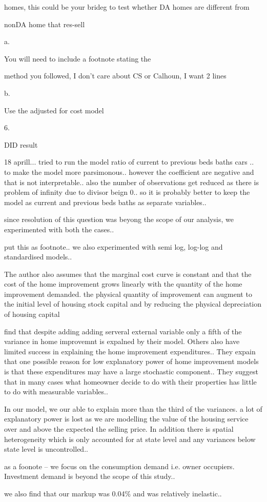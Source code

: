 homes, this could be your brideg to test whether DA homes are different from

nonDA home that res-sell





a.     

You will need to include a footnote stating the

method you followed, I don’t care about CS or Calhoun, I want 2 lines





b.     

Use the adjusted for cost model





6.     

DID result




18 aprill...
tried to run the model ratio of current to previous beds baths cars .. to make the model more parsimonous.. however the coefficient are negative and that is not interpretable..
also the number of observations get reduced as there is problem of infinity due to divisor beign 0.. so it is probably better to keep the model as current and previous beds baths as separate variables..

since resolution of this question was beyong the scope of our analysis, we experimented with both the cases..


put this as footnote.. we also experimented with semi log, log-log and standardised models..



\cite{boehm1986improvement}  The author also assumes that the marginal cost curve is constant and that the cost of the home improvement grows linearly with the quantity of the home improvement demanded.
the physical quantity of improvement can augment to the initial level of housing stock capital and by reducing the physical depreciation of housing capital

\cite{boehm1986improvement} find that despite adding adding serveral external variable only a fifth of the variance in home improvemnt is expalned by their model. Others also have limited success in explaining the home improvement expenditures..  They expain that one possible reason for low explanatory power of home improvement models is that these expenditures may have a large stochastic component.. They suggest that in many cases what homeowner decide to do with their properties has little to do with measurable variables..

In our model, we our able to explain more than the third of the variances. a lot of explanatory power is lost as we are modelling the value of the housing service over and above the expected the selling price. In addition there is spatial heterogeneity which is only accounted for at state level and any variances below state level is uncontrolled..


as a foonote -- we focus on the consumption demand i.e. owner occupiers. Investment demand is beyond the scope of this study..

we also find that our markup was 0.04\% and was relatively inelastic..